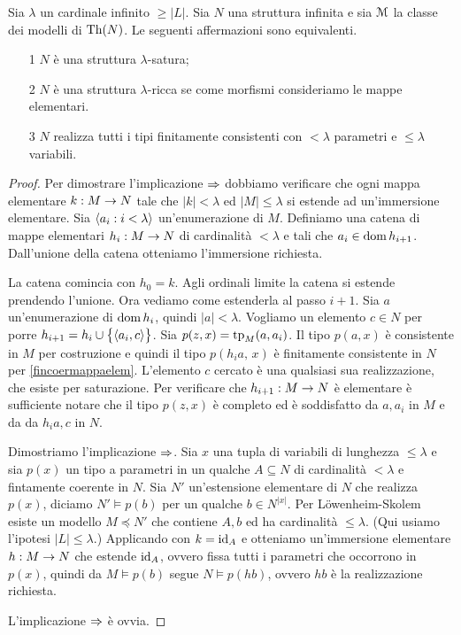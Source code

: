 \begin{lemma}\label{saturo->ricco}
Sia $\lambda$ un cardinale infinito $\ge|L|$. Sia $N$ una struttura infinita e sia $\EuScript M$ la classe dei modelli di $\textrm{Th}(N)$. Le seguenti affermazioni sono equivalenti. 
\begin{itemize}
\item[1] $N$ \`e una struttura $\lambda$-satura;
\item[2] $N$ \`e una struttura $\lambda$-ricca se come morfismi consideriamo le mappe elementari.
\item[3] $N$ realizza tutti i tipi finitamente consistenti con $<\lambda$ parametri e $\le\lambda$ variabili.
\end{itemize}
\end{lemma}
\begin{proof}
Per dimostrare l'implicazione $\Rightarrow$ dobbiamo verificare che ogni mappa elementare $k:M\rightarrow N$ tale che $|k|<\lambda$ ed $|M|\le\lambda$ si estende ad un'immersione elementare. Sia $\langle a_i:i<\lambda\rangle$ un'enumerazione di $M$. Definiamo una catena di mappe elementari $h_i:M\rightarrow N$ di cardinalit\`a $<\lambda$ e tali che $a_i\in\mathop{\rm dom} h_{i+1}$. Dall'unione della catena otteniamo l'immersione richiesta.

La catena comincia con $h_0=k$. Agli ordinali limite la catena si estende prendendo l'unione. Ora vediamo come estenderla al passo $i+1$. Sia $a$ un'enumerazione di $\mathop{\rm dom} h_i$, quindi $|a|<\lambda$.  Vogliamo un elemento $c\in N$ per porre $h_{i+1}=h_i\cup\big\{\langle a_i,c\rangle\big\}$. Sia $p(z,x)=\textrm{tp}_M(a,a_i)$. Il tipo $p(a,x)$ \`e consistente in $M$ per costruzione e quindi il tipo $p(h_ia,\,x)$  \`e finitamente consistente in $N$ per \ref{fincoermappaelem}. L'elemento $c$ cercato \`e una qualsiasi sua realizzazione, che esiste per saturazione. Per verificare che $h_{i+1}:M\rightarrow N$ \`e elementare \`e sufficiente notare che il tipo $p(z,x)$ \`e completo ed \`e soddisfatto da $a,a_i$ in $M$ e da da $h_ia,c$ in $N$.

Dimostriamo l'implicazione $\Rightarrow$. Sia $x$ una tupla di variabili di lunghezza $\le\lambda$ e sia $p(x)$ un tipo a parametri in un qualche $A\subseteq N$ di cardinalit\`a $<\lambda$ e fintamente coerente in $N$. Sia $N'$ un'estensione elementare di $N$ che realizza $p(x)$, diciamo $N'\models p(b)$ per un qualche $b\in N^{|x|}$. Per L\"owenheim-Skolem esiste un modello $M\preceq N'$ che contiene $A,b$ ed ha cardinalit\`a $\le\lambda$. (Qui usiamo l'ipotesi $|L|\le\lambda$.) Applicando  con $k=\textrm{id}_A$ e otteniamo un'immersione elementare $h:M\rightarrow N$ che estende $\textrm{id}_A$, ovvero fissa tutti i parametri che occorrono in $p(x)$, quindi da $M\models p(b)$ segue $N\models p(hb)$, ovvero $hb$ \`e la realizzazione richiesta.

L'implicazione $\Rightarrow$ \`e ovvia. 
\end{proof}

